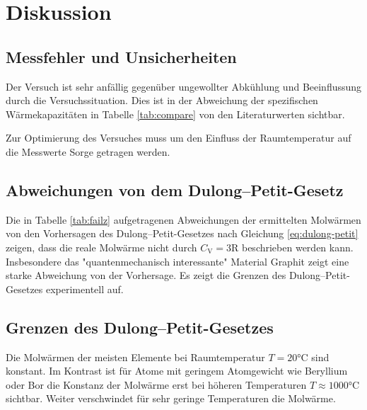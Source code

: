 \section{Diskussion}
\label{sec:Diskussion}
\subsection{Messfehler und Unsicherheiten}
Der Versuch ist sehr anfällig gegenüber ungewollter Abkühlung und Beeinflussung durch die Versuchssituation.
Dies ist in der Abweichung der spezifischen Wärmekapazitäten in Tabelle \ref{tab:compare} von den Literaturwerten sichtbar.

Zur Optimierung des Versuches muss um den Einfluss der Raumtemperatur auf die Messwerte Sorge getragen werden.

\subsection{Abweichungen von dem Dulong--Petit-Gesetz}
Die in Tabelle \ref{tab:failz} aufgetragenen Abweichungen der ermittelten Molwärmen von den Vorhersagen des Dulong--Petit-Gesetzes nach Gleichung \eqref{eq:dulong-petit} zeigen, dass die reale Molwärme nicht durch $C_\text{V}=3\text{R}$ beschrieben werden kann. 
Insbesondere das "quantenmechanisch interessante" Material Graphit zeigt eine starke Abweichung von der Vorhersage.
Es zeigt die Grenzen des Dulong--Petit-Gesetzes experimentell auf.

\subsection{Grenzen des Dulong--Petit-Gesetzes}
Die Molwärmen der meisten Elemente bei Raumtemperatur $T=20\si{\celsius}$ sind konstant.
Im Kontrast ist für Atome mit geringem Atomgewicht wie Beryllium oder Bor die Konstanz der Molwärme erst bei höheren Temperaturen $T\approx{1000\si{\celsius}}$ sichtbar. 
Weiter verschwindet für sehr geringe Temperaturen die Molwärme.

